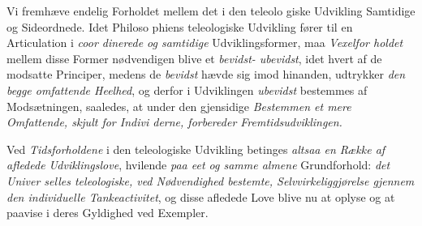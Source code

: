 Vi fremhæve endelig Forholdet mellem det i den teleolo\-%
giske Udvikling Samtidige og Sideordnede. Idet Philoso\-%
phiens teleologiske Udvikling fører til en Articulation i \emph{coor\-%
dinerede og samtidige} Udviklingsformer, maa \emph{Vexelfor\-%
holdet} mellem disse Former nødvendigen blive et \emph{bevidst-%
ubevidst}, idet hvert af de modsatte Principer, medens de
\emph{bevidst} hævde sig imod hinanden, udtrykker \emph{den begge
omfattende Heelhed}, og derfor i Udviklingen \emph{ubevidst}
bestemmes af Modsætningen, saaledes, at under den gjensidige
\emph{Bestemmen et mere Omfattende, skjult for Indivi\-%
derne, forbereder Fremtidsudviklingen.}

Ved \emph{Tidsforholdene} i den teleologiske Udvikling betinges
\emph{altsaa en Række af afledede Udviklingslove}, hvilende
\emph{paa eet og samme almene} Grundforhold: \emph{det Univer\-%
selles teleologiske, ved Nødvendighed bestemte,
Selvvirkeliggjørelse gjennem den individuelle
Tankeactivitet}, og disse afledede Love blive nu at oplyse
og at paavise i deres Gyldighed ved Exempler.

\divrule

